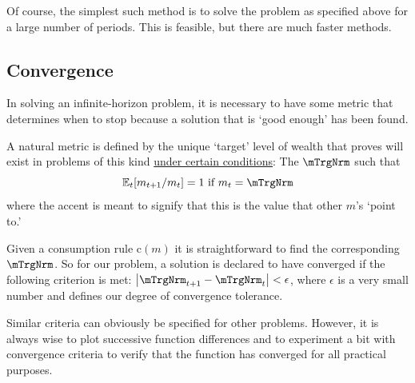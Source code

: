 \documentclass[titlepage, headings=optiontotocandhead]{econtex}
\begin{document}
Of course, the simplest such method is to solve the problem as
specified above for a large number of periods.  This is feasible, but
there are much faster methods.

\subsection{Convergence}

In solving an infinite-horizon problem, it is necessary to have some
metric that determines when to stop because a solution that is `good
enough' has been found.

A natural metric is defined by the unique `target' level of wealth that \cite{BufferStockTheory} proves
will exist in problems of this kind \href{https://llorracc.github.io/BufferStockTheory#GICNrm}{under certain conditions}: The $\mTrgNrm$ such that
\begin{equation}
  {\mathbb{E}}_t [{m}_{t+1}/m_t] = 1 \mbox{~if~} m_t = \mTrgNrm  \label{eq:mTrgNrmet}
\end{equation}
where the accent is meant to signify that this is the value
that other $m$'s `point to.'

Given a consumption rule $\mathrm{c}(m)$ it is straightforward to find
the corresponding $\mTrgNrm$.  So for our problem, a solution is declared
to have converged if the following criterion is met:
$\left|\mTrgNrm_{t+1}-\mTrgNrm_{t}\right| < \epsilon$, where $\epsilon$ is
a very small number and defines our degree of convergence tolerance.

Similar criteria can obviously be specified for other problems.
However, it is always wise to plot successive function differences and
to experiment a bit with convergence criteria to verify that the
function has converged for all practical purposes.
\end{document}
